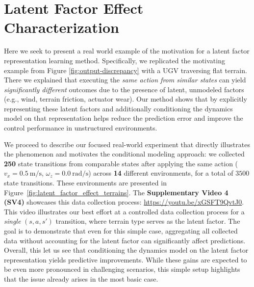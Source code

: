 \documentclass[Afour,sageh,times]{sagej}
\theoremstyle{lemma}
\begin{document}


\appendix

\clearpage

\section{Latent Factor Effect Characterization}\label{sec:appendix-latent-effect-char}

Here we seek to present a real world example of the motivation for a latent factor representation learning method. Specifically, we replicated the motivating example from Figure \ref{fig:output-discrepancy} with a UGV traversing flat terrain. There we explained that executing the \emph{same action from similar states} can yield \emph{significantly different} outcomes due to the presence of latent, unmodeled factors (e.g., wind, terrain friction, actuator wear). Our method shows that by explicitly representing these latent factors and additionally conditioning the dynamics model on that representation helps reduce the prediction error and improve the control performance in unstructured environments.

We proceed to describe our focused real-world experiment that directly illustrates the phenomenon and motivates the conditional modeling approach: we collected \textbf{250} state transitions from comparable states after applying the same action ($v_x=0.5\ \mathrm{m/s}$, $\omega_z=0.0\ \mathrm{rad/s}$) across \textbf{14} different environments, for a total of $3500$ state transitions. These environments are presented in Figure~\ref{fig:latent_factor_effect_terrains}. The \textbf{Supplementary Video 4 (SV4)} showcases this data collection process: \url{https://youtu.be/xGSFT9QvtJ0}. This video illustrates our best effort at a controlled data collection process for a \textit{single} $(s, a, s')$ transition, where terrain type serves as the latent factor. The goal is to demonstrate that even for this simple case, aggregating all collected data without accounting for the latent factor can significantly affect predictions. Overall, this let us see that conditioning the dynamics model on the latent factor representation yields predictive improvements. While these gains are expected to be even more pronounced in challenging scenarios, this simple setup highlights that the issue already arises in the most basic case.
\end{document}
